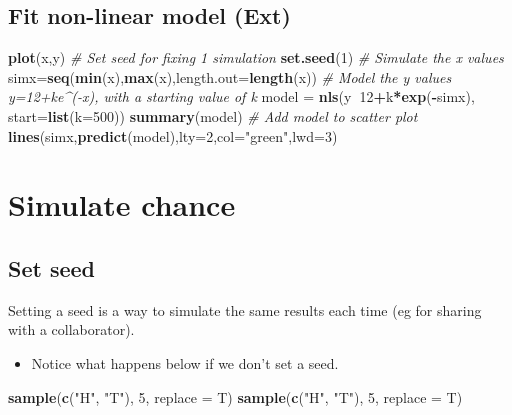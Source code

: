 \documentclass[]{article}
\newenvironment{Shaded}{\begin{snugshade}}{\end{snugshade}}
\newcommand{\CommentTok}[1]{\textcolor[rgb]{0.56,0.35,0.01}{\textit{#1}}}
\newcommand{\DataTypeTok}[1]{\textcolor[rgb]{0.13,0.29,0.53}{#1}}
\newcommand{\DecValTok}[1]{\textcolor[rgb]{0.00,0.00,0.81}{#1}}
\newcommand{\KeywordTok}[1]{\textcolor[rgb]{0.13,0.29,0.53}{\textbf{#1}}}
\newcommand{\NormalTok}[1]{#1}
\newcommand{\OperatorTok}[1]{\textcolor[rgb]{0.81,0.36,0.00}{\textbf{#1}}}
\newcommand{\StringTok}[1]{\textcolor[rgb]{0.31,0.60,0.02}{#1}}
\providecommand{\tightlist}{%
  \setlength{\itemsep}{0pt}\setlength{\parskip}{0pt}}
\begin{document}
\hypertarget{fit-non-linear-model-ext}{%
\subsection{Fit non-linear model (Ext)}\label{fit-non-linear-model-ext}}

\begin{Shaded}
\begin{Highlighting}[]
\KeywordTok{plot}\NormalTok{(x,y)}
\CommentTok{# Set seed for fixing 1 simulation}
\KeywordTok{set.seed}\NormalTok{(}\DecValTok{1}\NormalTok{)}
\CommentTok{# Simulate the x values}
\NormalTok{simx=}\KeywordTok{seq}\NormalTok{(}\KeywordTok{min}\NormalTok{(x),}\KeywordTok{max}\NormalTok{(x),}\DataTypeTok{length.out=}\KeywordTok{length}\NormalTok{(x))}
\CommentTok{# Model the y values y=12+ke^(-x), with a starting value of k }
\NormalTok{model =}\StringTok{ }\KeywordTok{nls}\NormalTok{(y}\OperatorTok{~}\DecValTok{12}\OperatorTok{+}\NormalTok{k}\OperatorTok{*}\KeywordTok{exp}\NormalTok{(}\OperatorTok{-}\NormalTok{simx), }\DataTypeTok{start=}\KeywordTok{list}\NormalTok{(}\DataTypeTok{k=}\DecValTok{500}\NormalTok{))}
\KeywordTok{summary}\NormalTok{(model)}
\CommentTok{# Add model to scatter plot}
\KeywordTok{lines}\NormalTok{(simx,}\KeywordTok{predict}\NormalTok{(model),}\DataTypeTok{lty=}\DecValTok{2}\NormalTok{,}\DataTypeTok{col=}\StringTok{"green"}\NormalTok{,}\DataTypeTok{lwd=}\DecValTok{3}\NormalTok{)}
\end{Highlighting}
\end{Shaded}

\hypertarget{simulatechance}{%
\section{Simulate chance}\label{simulatechance}}

\hypertarget{set-seed}{%
\subsection{Set seed}\label{set-seed}}

Setting a seed is a way to simulate the same results each time (eg for sharing with a collaborator).

\begin{itemize}
\tightlist
\item
  Notice what happens below if we don't set a seed.
\end{itemize}

\begin{Shaded}
\begin{Highlighting}[]
\KeywordTok{sample}\NormalTok{(}\KeywordTok{c}\NormalTok{(}\StringTok{"H"}\NormalTok{, }\StringTok{"T"}\NormalTok{), }\DecValTok{5}\NormalTok{, }\DataTypeTok{replace =}\NormalTok{ T)}
\KeywordTok{sample}\NormalTok{(}\KeywordTok{c}\NormalTok{(}\StringTok{"H"}\NormalTok{, }\StringTok{"T"}\NormalTok{), }\DecValTok{5}\NormalTok{, }\DataTypeTok{replace =}\NormalTok{ T)}
\end{Highlighting}
\end{Shaded}
\end{document}
